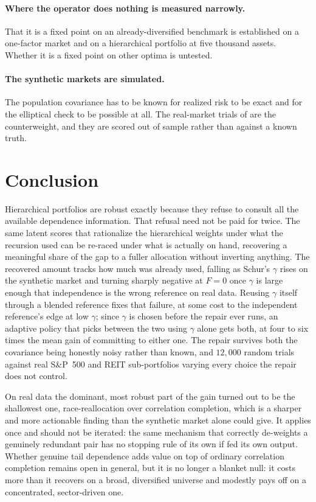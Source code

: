 \documentclass[11pt]{article}
\begin{document}
\paragraph{Where the operator does nothing is measured narrowly.} That it is a
fixed point on an already-diversified benchmark is established on a one-factor
market and on a hierarchical portfolio at five thousand assets. Whether it is a
fixed point on other optima is untested.

\paragraph{The synthetic markets are simulated.} The population covariance has
to be known for realized risk to be exact and for the elliptical check to be
possible at all. The real-market trials of  are the
counterweight, and they are scored out of sample rather than against a known
truth.

\section{Conclusion}

Hierarchical portfolios are robust exactly because they refuse to consult
all the available dependence information. That refusal need not be paid
for twice. The same latent scores that rationalize the hierarchical weights
under what the recursion used can be re-raced under what is actually on
hand, recovering a meaningful share of the gap to a fuller allocation
without inverting anything. The recovered amount tracks how much was
already used, falling as Schur's $\gamma$ rises on the synthetic market and
turning sharply negative at $F=0$ once $\gamma$ is large enough that
independence is the wrong reference on real data. Reusing $\gamma$ itself
through a blended reference fixes that failure, at some cost to the
independent reference's edge at low $\gamma$; since $\gamma$ is chosen
before the repair ever runs, an adaptive policy that picks between the two
using $\gamma$ alone gets both, at four to six times the mean gain of
committing to either one. The repair survives both the covariance being
honestly noisy rather than known, and $12{,}000$ random trials against real
S\&P~500 and REIT sub-portfolios varying every choice the repair does not
control.

On real data the dominant, most robust part of the gain turned out to be
the shallowest one, race-reallocation over correlation completion, which is
a sharper and more actionable finding than the synthetic market alone could
give. It applies once and should not be iterated: the same mechanism that
correctly de-weights a genuinely redundant pair has no stopping rule of its
own if fed its own output. Whether genuine tail dependence adds value on
top of ordinary correlation completion remains open in general, but it is
no longer a blanket null: it costs more than it recovers on a broad,
diversified universe and modestly pays off on a concentrated, sector-driven
one.
\end{document}
